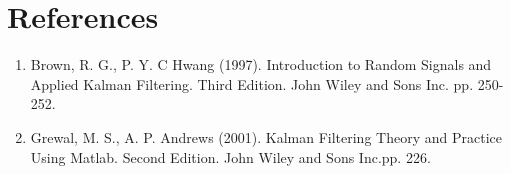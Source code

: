 \documentclass[letterpaper,11pt]{article}
\begin{document}
\section{References}
\begin{enumerate}
\item Brown, R. G., P. Y. C  Hwang (1997). Introduction to Random Signals and Applied Kalman Filtering. Third Edition. John Wiley and Sons Inc.  pp. 250-252.
\item Grewal, M. S., A. P. Andrews (2001). Kalman Filtering Theory and Practice Using Matlab. Second Edition. John Wiley and Sons Inc.pp. 226.
\end{enumerate}
\end{document}
